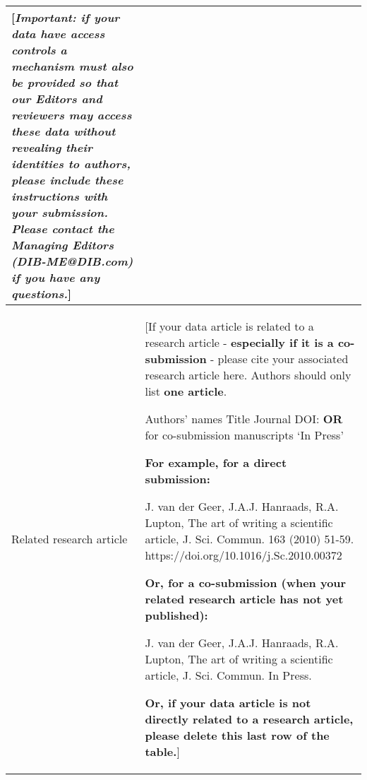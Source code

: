 \documentclass[times,final]{elsarticle.cls}
\begin{document}
{\begin{longtable}{|p{33mm}|p{94mm}|}
                         [\textit{Important: if your data have access controls a mechanism must also be 
                         provided so that our Editors and reviewers may access these data 
                         without revealing their identities to authors, please include 
                         these instructions with your submission. Please contact the Managing 
                         Editors (DIB-ME@DIB.com) if you have any questions.}]\\                         
\hline                         
Related                 
research\newline
article                & [If your data article is related to a research article - \textbf{especially 
                         if it is a co-submission} - please cite your associated research 
                         article here. Authors should only list \textbf{one article}.\newline

                         Authors' names\newline
                         Title\newline
                         Journal\newline
                         DOI: \textbf{OR} for co-submission manuscripts `In Press'\newline

                         \textbf{For example, for a direct submission:}\newline

                         J. van der Geer, J.A.J. Hanraads, R.A. Lupton, The art of writing a scientific article, 
                         J. Sci. Commun. 163 (2010) 51-59. https://doi.org/10.1016/j.Sc.2010.00372\newline

                         \textbf{Or, for a co-submission (when your related research article has not yet published):}\newline

                         J. van der Geer, J.A.J. Hanraads, R.A. Lupton, The art of writing a 
                         scientific article, J. Sci. Commun. In Press.\newline

                         \textbf{Or, if your data article is not directly related to a research article, 
                         please delete this last row of the table.}]
\end{longtable}
}
\end{document}
